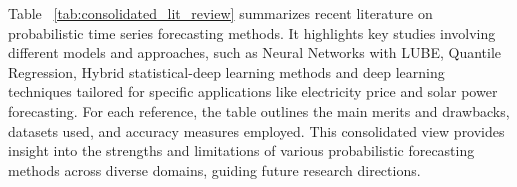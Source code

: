 Table ~\ref{tab:consolidated_lit_review} summarizes recent literature on probabilistic time series forecasting methods. It highlights key studies involving different models and approaches, such as Neural Networks with LUBE, Quantile Regression, Hybrid statistical-deep learning methods and deep learning techniques tailored for specific applications like electricity price and solar power forecasting. For each reference, the table outlines the main merits and drawbacks, datasets used, and accuracy measures employed. This consolidated view provides insight into the strengths and limitations of various probabilistic forecasting methods across diverse domains, guiding future research directions.
